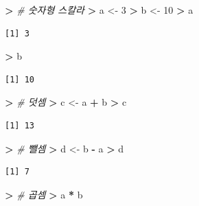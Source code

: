 \documentclass[11pt,a4paper]{book}
\newenvironment{Shaded}{\begin{snugshade}}{\end{snugshade}}
\newcommand{\DecValTok}[1]{\textcolor[rgb]{0.00,0.00,0.81}{#1}}
\newcommand{\StringTok}[1]{\textcolor[rgb]{0.31,0.60,0.02}{#1}}
\newcommand{\CommentTok}[1]{\textcolor[rgb]{0.56,0.35,0.01}{\textit{#1}}}
\newcommand{\OperatorTok}[1]{\textcolor[rgb]{0.81,0.36,0.00}{\textbf{#1}}}
\newcommand{\ErrorTok}[1]{\textcolor[rgb]{0.64,0.00,0.00}{\textbf{#1}}}
\newcommand{\NormalTok}[1]{#1}
\theoremstyle{definition}
\theoremstyle{definition}
\theoremstyle{definition}
\theoremstyle{remark}
\begin{document}
\footnotesize

\begin{Shaded}
\begin{Highlighting}[]
\OperatorTok{>}\StringTok{ }\CommentTok{# 숫자형 스칼라}
\ErrorTok{>}\StringTok{ }\NormalTok{a <-}\StringTok{ }\DecValTok{3}
\OperatorTok{>}\StringTok{ }\NormalTok{b <-}\StringTok{ }\DecValTok{10}
\OperatorTok{>}\StringTok{ }\NormalTok{a}
\end{Highlighting}
\end{Shaded}

\begin{verbatim}
[1] 3
\end{verbatim}

\begin{Shaded}
\begin{Highlighting}[]
\OperatorTok{>}\StringTok{ }\NormalTok{b}
\end{Highlighting}
\end{Shaded}

\begin{verbatim}
[1] 10
\end{verbatim}

\begin{Shaded}
\begin{Highlighting}[]
\OperatorTok{>}\StringTok{ }\CommentTok{# 덧셈}
\ErrorTok{>}\StringTok{ }\NormalTok{c <-}\StringTok{ }\NormalTok{a }\OperatorTok{+}\StringTok{ }\NormalTok{b}
\OperatorTok{>}\StringTok{ }\NormalTok{c}
\end{Highlighting}
\end{Shaded}

\begin{verbatim}
[1] 13
\end{verbatim}

\begin{Shaded}
\begin{Highlighting}[]
\OperatorTok{>}\StringTok{ }\CommentTok{# 뺄셈}
\ErrorTok{>}\StringTok{ }\NormalTok{d <-}\StringTok{ }\NormalTok{b }\OperatorTok{-}\StringTok{ }\NormalTok{a}
\OperatorTok{>}\StringTok{ }\NormalTok{d}
\end{Highlighting}
\end{Shaded}

\begin{verbatim}
[1] 7
\end{verbatim}

\begin{Shaded}
\begin{Highlighting}[]
\OperatorTok{>}\StringTok{ }\CommentTok{# 곱셈}
\ErrorTok{>}\StringTok{ }\NormalTok{a }\OperatorTok{*}\StringTok{ }\NormalTok{b}
\end{Highlighting}
\end{Shaded}
\end{document}
